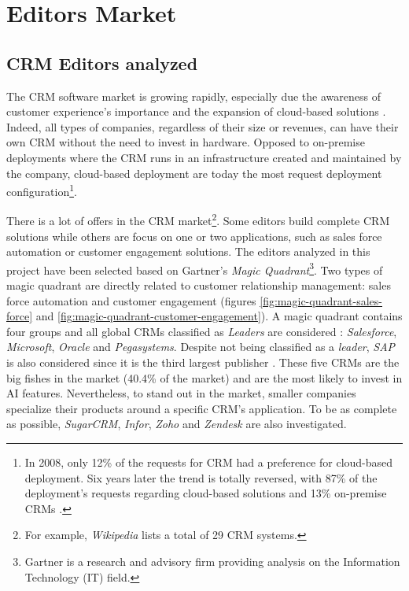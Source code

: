 \section{Editors Market}


\subsection{CRM Editors analyzed}
The CRM software market is growing rapidly, especially due the awareness of customer experience's importance and the expansion of cloud-based solutions \cite{crm-revenue}. Indeed, all types of companies, regardless of their size or revenues, can have their own CRM without the need to invest in hardware. Opposed to on-premise deployments where the CRM runs in an infrastructure created and maintained by the company, cloud-based deployment are today the most request deployment configuration\footnote{In 2008, only 12\% of the requests for CRM had a preference for cloud-based deployment. Six years later the trend is totally reversed, with 87\% of the deployment's requests regarding cloud-based solutions and 13\% on-premise CRMs \cite{crm-deployment-stats}.}.

There is a lot of offers in the CRM market\footnote{For example, \textit{Wikipedia} lists a total of 29 CRM systems.}. Some editors build complete CRM solutions while others are focus on one or two applications, such as sales force automation or customer engagement solutions. The editors analyzed in this project have been selected based on Gartner's \textit{Magic Quadrant}\footnote{Gartner is a research and advisory firm providing analysis on the Information Technology (IT) field.}. Two types of magic quadrant are directly related to customer relationship management: sales force automation and customer engagement (figures \ref{fig:magic-quadrant-sales-force} and \ref{fig:magic-quadrant-customer-engagement}). A magic quadrant contains four groups and all global CRMs classified as \textit{Leaders} are considered : \textit{Salesforce}, \textit{Microsoft}, \textit{Oracle} and \textit{Pegasystems}. Despite not being classified as a \textit{leader}, \textit{SAP} is also considered since it is the third largest publisher \cite{crm-market-share}. These five CRMs are the big fishes in the market (40.4\% of the market) and are the most likely to invest in AI features. Nevertheless, to stand out in the market, smaller companies specialize their products around a specific CRM's application. To be as complete as possible, \textit{SugarCRM}, \textit{Infor}, \textit{Zoho} and \textit{Zendesk} are also investigated.

